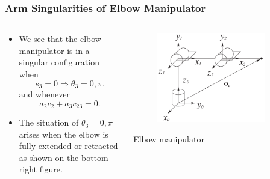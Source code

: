 \begin{frame}
    \frametitle{Arm Singularities of Elbow Manipulator}

    \begin{columns}
        \begin{column}{0.6\textwidth}
            \begin{itemize}
                \item We see that the elbow manipulator is
                in a singular configuration when
                \[ s_3 = 0 \Longrightarrow \theta_3 = 0, \pi. \]
                and whenever
                \[ a_2c_2 + a_3c_{23} = 0. \]
                \item The situation of $\theta_3 = 0, \pi$ arises when the elbow
                is fully extended or retracted as shown on the bottom right
                figure.
            \end{itemize}
        \end{column}
        \begin{column}{0.4\textwidth}
            \begin{figure}[bth]
                \centering
                \includegraphics[width=0.85\textwidth]{figures/elbow_manipulator_sing.png} 
            \end{figure}
            \vspace{-2mm}
            \centering
            \footnotesize{Elbow manipulator}


\end{column}
\end{columns}
\end{frame}
